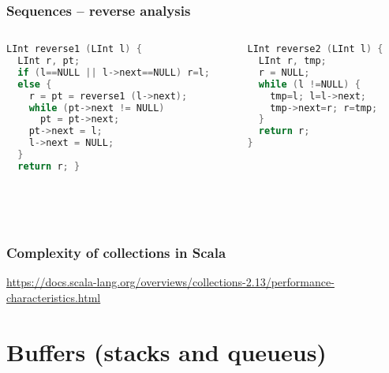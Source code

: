 \documentclass[aspectratio=169]{beamer}
\begin{document}
\begin{frame}[fragile]\frametitle{Sequences -- reverse analysis}
  
\begin{columns}
\begin{column}{.48\textwidth}
\begin{lstlisting}[language=C++, emph={reverse1,reverse2,LInt}]
LInt reverse1 (LInt l) {
  LInt r, pt;
  if (l==NULL || l->next==NULL) r=l;
  else {
    r = pt = reverse1 (l->next);
    while (pt->next != NULL)
      pt = pt->next;
    pt->next = l;
    l->next = NULL;
  }
  return r; }
\end{lstlisting}
%
\end{column}
\begin{column}{.50\textwidth}
%
\begin{lstlisting}[language=C++, emph={reverse1,reverse2,LInt}]
LInt reverse2 (LInt l) {
  LInt r, tmp;
  r = NULL;
  while (l !=NULL) {
    tmp=l; l=l->next;
    tmp->next=r; r=tmp;
  }
  return r;
}
\end{lstlisting}
%
\end{column}
\end{columns}

~\\[-6mm]
~\\[-12mm]
\end{frame}


\begin{frame}\frametitle{Complexity of collections in Scala}
    
    \centering

    \begin{block}{}
    {\huge \url{https://docs.scala-lang.org/overviews/collections-2.13/performance-characteristics.html}}      
    \end{block}


\end{frame}


\section{Buffers (stacks and queueus)}
\end{document}
